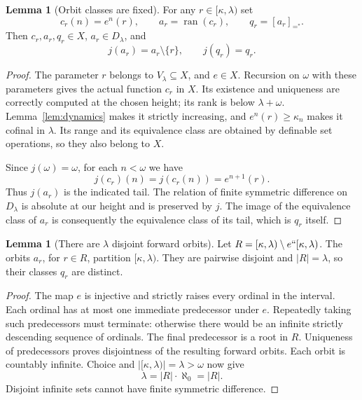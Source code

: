 \documentclass[11pt,letterpaper]{article}
\theoremstyle{definition}
\newtheorem{lemma}[definition]{Lemma}
\newcommand{\ran}{\operatorname{ran}}
\begin{document}
\begin{lemma}[Orbit classes are fixed]\label{lem:orbitclass}
For any $r\in[\kappa,\lambda)$ set
\[
 c_r(n)=e^n(r),\qquad a_r=\ran(c_r),\qquad q_r=[a_r]_{=^*}.
\]
Then $c_r,a_r,q_r\in X$, $a_r\in D_\lambda$, and
\[
                  j(a_r)=a_r\setminus\{r\},\qquad j(q_r)=q_r.
\]
\end{lemma}

\begin{proof}
The parameter $r$ belongs to $V_\lambda\subseteq X$, and $e\in X$. Recursion on $\omega$ with these parameters gives the actual function $c_r$ in $X$. Its existence and uniqueness are correctly computed at the chosen height; its rank is below $\lambda+\omega$. Lemma~\ref{lem:dynamics} makes it strictly increasing, and $e^n(r)\ge\kappa_n$ makes it cofinal in $\lambda$. Its range and its equivalence class are obtained by definable set operations, so they also belong to $X$.

Since $j(\omega)=\omega$, for each $n<\omega$ we have
\[
                       j(c_r)(n)=j(c_r(n))=e^{n+1}(r).
\]
Thus $j(a_r)$ is the indicated tail. The relation of finite symmetric difference on $D_\lambda$ is absolute at our height and is preserved by $j$. The image of the equivalence class of $a_r$ is consequently the equivalence class of its tail, which is $q_r$ itself.
\end{proof}

\begin{lemma}[There are $\lambda$ disjoint forward orbits]\label{lem:manyorbits}
Let $R=[\kappa,\lambda)\setminus e``[\kappa,\lambda)$. The orbits $a_r$, for $r\in R$, partition $[\kappa,\lambda)$. They are pairwise disjoint and $|R|=\lambda$, so their classes $q_r$ are distinct.
\end{lemma}

\begin{proof}
The map $e$ is injective and strictly raises every ordinal in the interval. Each ordinal has at most one immediate predecessor under $e$. Repeatedly taking such predecessors must terminate: otherwise there would be an infinite strictly descending sequence of ordinals. The final predecessor is a root in $R$. Uniqueness of predecessors proves disjointness of the resulting forward orbits. Each orbit is countably infinite. Choice and $|[\kappa,\lambda)|=\lambda>\omega$ now give
\[
                            \lambda=|R|\cdot\aleph_0=|R|.
\]
Disjoint infinite sets cannot have finite symmetric difference.
\end{proof}
\end{document}
